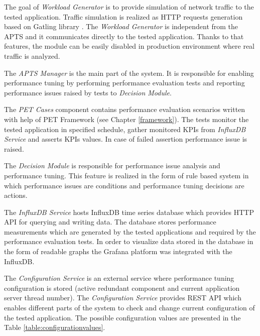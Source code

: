 \documentclass[12pt,a4paper]{article}
\begin{document}
The goal of \textit{Workload Generator} is to provide simulation of network traffic to the tested application. Traffic simulation is realized as HTTP requests generation based on Gatling library \cite{gatling}. The \textit{Workload Generator} is independent from the APTS and it communicates directly to the tested application. Thanks to that features, the module can be easily disabled in production environment where real traffic is analyzed.  

The \textit{APTS Manager} is the main part of the system. It is responsible for enabling performance tuning by performing performance evaluation tests and reporting performance issues raised by tests to \textit{Decision Module}. 

The \textit{PET Cases} component contains performance evaluation scenarios written with help of PET Framework (see Chapter \ref{framework}). The tests monitor the tested application in specified schedule, gather monitored KPIs from \textit{InfluxDB Service} and asserts KPIs values. In case of failed assertion performance issue is raised.

The \textit{Decision Module} is responsible for performance issue analysis and performance tuning. This feature is realized in the form of rule based system in which performance issues are conditions and performance tuning decisions are actions.   

The \textit{InfluxDB Service} hosts InfluxDB \cite{influxdb} time series database which provides HTTP API for querying and writing data. The database stores performance measurements which are generated by the tested applications and required by the performance evaluation tests. In order to visualize data stored in the database in the form of readable graphs the Grafana \cite{grafana} platform was integrated with the InfluxDB. 

The \textit{Configuration Service} is an external service where performance tuning configuration is stored (active redundant component and current application server thread number). The \textit{Configuration Service} provides REST API which enables different parts of the system to check and change current configuration of the tested application. The possible configuration values are presented in the Table \ref{table:configurationvalues}.
\end{document}
